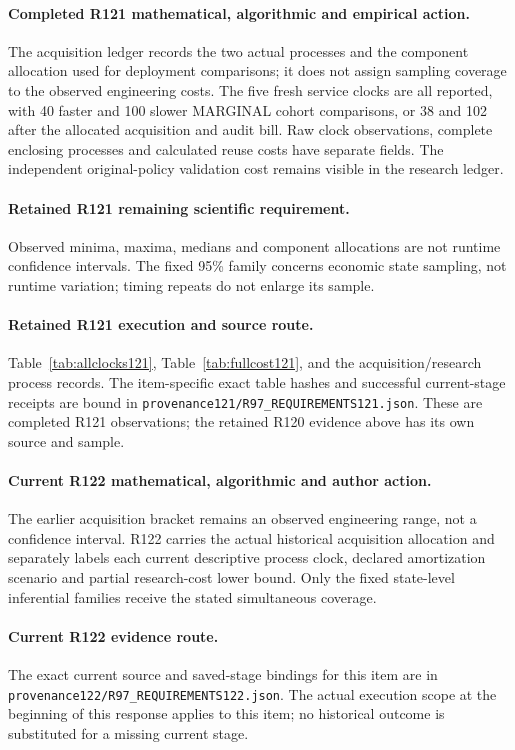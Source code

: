 \paragraph{Completed R121 mathematical, algorithmic and empirical action.}
The acquisition ledger records the two actual processes and the component allocation used for deployment comparisons; it does not assign sampling coverage to the observed engineering costs. The five fresh service clocks are all reported, with 40 faster and 100 slower MARGINAL cohort comparisons, or 38 and 102 after the allocated acquisition and audit bill. Raw clock observations, complete enclosing processes and calculated reuse costs have separate fields. The independent original-policy validation cost remains visible in the research ledger.

\paragraph{Retained R121 remaining scientific requirement.}
Observed minima, maxima, medians and component allocations are not runtime confidence intervals. The fixed 95\% family concerns economic state sampling, not runtime variation; timing repeats do not enlarge its sample.

\paragraph{Retained R121 execution and source route.}
Table~\ref{tab:allclocks121}, Table~\ref{tab:fullcost121}, and the acquisition/research process records.
The item-specific exact table hashes and successful current-stage receipts are bound in \nolinkurl{provenance121/R97_REQUIREMENTS121.json}. These are completed R121 observations; the retained R120 evidence above has its own source and sample.
\paragraph{Current R122 mathematical, algorithmic and author action.}
The earlier acquisition bracket remains an observed engineering range, not a confidence interval. R122 carries the actual historical acquisition allocation and separately labels each current descriptive process clock, declared amortization scenario and partial research-cost lower bound. Only the fixed state-level inferential families receive the stated simultaneous coverage.
\paragraph{Current R122 evidence route.}
The exact current source and saved-stage bindings for this item are in \nolinkurl{provenance122/R97_REQUIREMENTS122.json}. The actual execution scope at the beginning of this response applies to this item; no historical outcome is substituted for a missing current stage.
